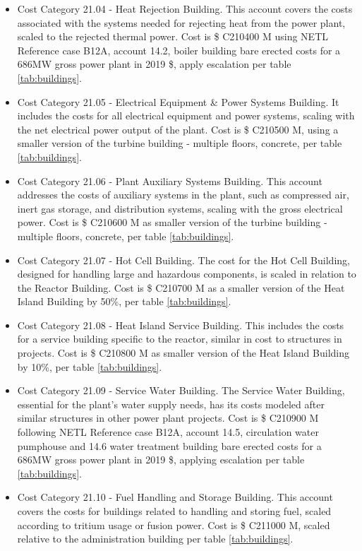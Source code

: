 \begin{itemize}
    \item Cost Category 21.04 - Heat Rejection Building. This account covers the costs associated with the systems needed for rejecting heat from the power plant, scaled to the rejected thermal power. Cost is \$ C210400 M using NETL Reference case B12A, account 14.2, boiler building bare erected costs for a 686MW gross power plant in 2019 \$, apply escalation per table \ref{tab:buildings}.
    \item Cost Category 21.05 - Electrical Equipment \& Power Systems Building. It includes the costs for all electrical equipment and power systems, scaling with the net electrical power output of the plant. Cost is \$ C210500 M, using a smaller version of the turbine building - multiple floors, concrete, per table \ref{tab:buildings}.
    \item Cost Category 21.06 - Plant Auxiliary Systems Building. This account addresses the costs of auxiliary systems in the plant, such as compressed air, inert gas storage, and distribution systems, scaling with the gross electrical power. Cost is \$ C210600 M as smaller version of the turbine building - multiple floors, concrete, per table \ref{tab:buildings}.
    \item Cost Category 21.07 - Hot Cell Building. The cost for the Hot Cell Building, designed for handling large and hazardous components, is scaled in relation to the Reactor Building.  Cost is \$ C210700 M as a smaller version of the Heat Island Building by 50\%, per table \ref{tab:buildings}.
    \item Cost Category 21.08 - Heat Island Service Building. This includes the costs for a service building specific to the reactor, similar in cost to structures in projects. Cost is \$ C210800 M as smaller version of the Heat Island Building by 10\%, per table \ref{tab:buildings}.
    \item Cost Category 21.09 - Service Water Building. The Service Water Building, essential for the plant’s water supply needs, has its costs modeled after similar structures in other power plant projects. Cost is \$ C210900 M following NETL Reference case B12A, account 14.5, circulation water pumphouse and 14.6 water treatment building bare erected costs for a 686MW gross power plant in 2019 \$, applying escalation per table \ref{tab:buildings}.
    \item Cost Category 21.10 - Fuel Handling and Storage Building. This account covers the costs for buildings related to handling and storing fuel, scaled according to tritium usage or fusion power. Cost is \$ C211000 M, scaled relative to the administration building per table \ref{tab:buildings}.

\end{itemize}
